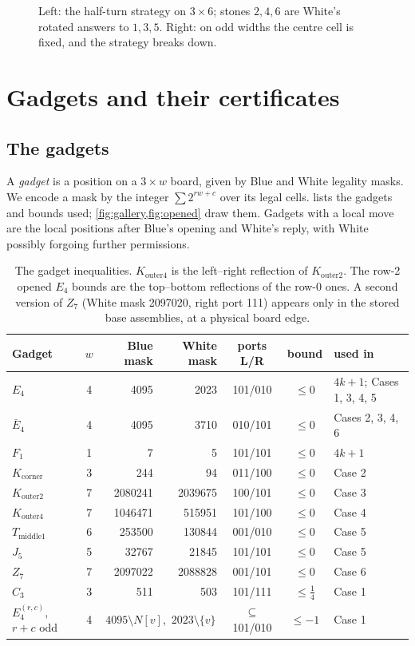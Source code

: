\documentclass[11pt]{amsart}
\theoremstyle{definition}
\newcommand{\Nb}{N}
\newcommand{\Ebar}{\bar E_4}
\newcommand{\Kc}{K_{\mathrm{corner}}}
\newcommand{\Ktwo}{K_{\mathrm{outer2}}}
\newcommand{\Kfour}{K_{\mathrm{outer4}}}
\newcommand{\Tm}{T_{\mathrm{middle1}}}
\begin{document}
\begin{figure}[ht]
\centering
{}\hspace{1cm}
\caption{Left: the half-turn strategy on $3\times 6$; stones $2,4,6$ are
White's rotated answers to $1,3,5$. Right: on odd widths the centre cell is
fixed, and the strategy breaks down.}
\label{fig:odd}
\end{figure}

\section{Gadgets and their certificates}\label{sec:gadgets}

\subsection{The gadgets}
A \emph{gadget} is a position on a $3\times w$ board, given by Blue and White
legality masks. We encode a mask by the integer $\sum 2^{rw+c}$ over its legal
cells.  lists the gadgets and bounds used;
\cref{fig:gallery,fig:opened} draw them. Gadgets with a local move are the
local positions after Blue's opening and White's reply, with White possibly
forgoing further permissions.

\begin{table}[ht]
\centering\small
\begin{tabular}{@{}l c r r c c l@{}}
\toprule
Gadget & $w$ & Blue mask & White mask & ports L/R & bound & used in\\
\midrule
$E_4$ & 4 & 4095 & 2023 & 101/010 & $\le0$ & $4k+1$; Cases 1, 3, 4, 5\\
$\Ebar$ & 4 & 4095 & 3710 & 010/101 & $\le0$ & Cases 2, 3, 4, 6\\
$F_1$ & 1 & 7 & 5 & 101/101 & $\le0$ & $4k+1$\\
$\Kc$ & 3 & 244 & 94 & 011/100 & $\le0$ & Case 2\\
$\Ktwo$ & 7 & 2080241 & 2039675 & 100/101 & $\le0$ & Case 3\\
$\Kfour$ & 7 & 1046471 & 515951 & 101/100 & $\le0$ & Case 4\\
$\Tm$ & 6 & 253500 & 130844 & 001/010 & $\le0$ & Case 5\\
$J_5$ & 5 & 32767 & 21845 & 101/101 & $\le0$ & Case 5\\
$Z_7$ & 7 & 2097022 & 2088828 & 001/101 & $\le0$ & Case 6\\
$C_3$ & 3 & 511 & 503 & 101/111 & $\le\tfrac14$ & Case 1\\
$E_4^{(r,c)}$, $r+c$ odd & 4 & \multicolumn{2}{c}{$4095\setminus\Nb[v]$,\ $2023\setminus\{v\}$} & $\subseteq$101/010 & $\le-1$ & Case 1\\
\bottomrule
\end{tabular}
\caption{The gadget inequalities. $\Kfour$ is the left--right reflection of
$\Ktwo$. The row-2 opened $E_4$ bounds are the top--bottom reflections of the
row-0 ones. A second version of $Z_7$ (White mask 2097020, right port 111)
appears only in the stored base assemblies, at a physical board edge.}
\label{tab:gadgets}
\end{table}
\end{document}
